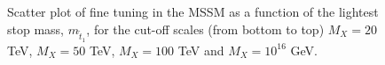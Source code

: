 \documentclass[preprint,amsmath,amssymb,aps,superscriptaddress,prd,showpacs,floatfix]{revtex4-1}
\begin{document}
\begin{figure}[h]
\begin{center}
\caption{Scatter plot of fine tuning in the MSSM as a function of
the lightest stop mass, $m_{\tilde{t}_1}$, for the cut-off scales (from 
bottom to top) $M_X=20$ TeV, $M_X=50$ TeV, $M_X=100$ TeV and $M_X=10^{16}$ GeV.}
\label{Fig:mssmstoptuning}
\end{center}
\end{figure}
\end{document}
